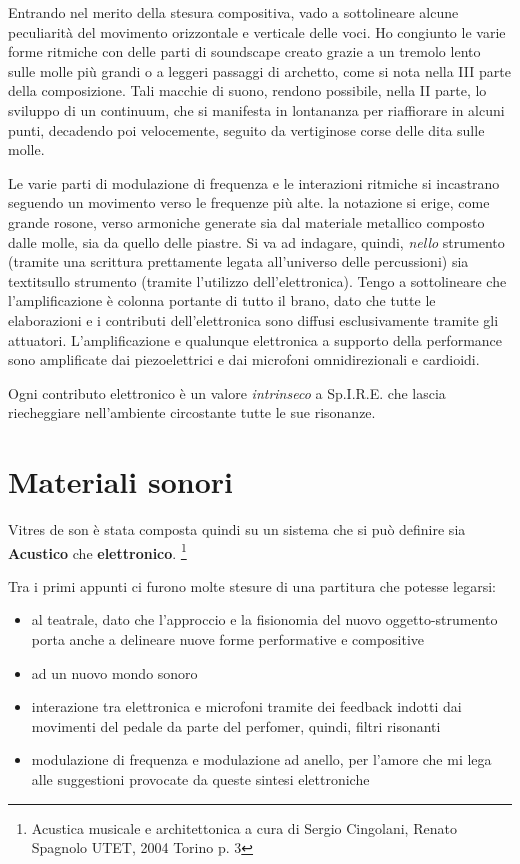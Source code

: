 Entrando nel merito della stesura compositiva, vado a sottolineare alcune peculiarità del movimento orizzontale e verticale delle voci. Ho congiunto le varie forme ritmiche con delle parti di soundscape creato grazie a un tremolo lento sulle molle più grandi o a leggeri passaggi di archetto, come si nota nella III parte della composizione. Tali macchie di suono, rendono possibile, nella II parte, lo sviluppo di un continuum, che si manifesta in lontananza per riaffiorare in alcuni punti, decadendo poi velocemente, seguito da vertiginose corse delle dita sulle molle.


Le varie parti di modulazione di frequenza e le interazioni ritmiche si incastrano seguendo un movimento verso le frequenze più alte. la notazione si erige, come grande rosone, verso armoniche generate sia dal materiale metallico composto dalle molle, sia da quello delle piastre. Si va ad indagare, quindi, \textit{nello} strumento (tramite una scrittura prettamente legata all'universo delle percussioni) sia textit{sullo} strumento (tramite l'utilizzo dell'elettronica). Tengo a sottolineare che l'amplificazione è colonna portante di tutto il brano, dato che tutte le elaborazioni e i contributi dell'elettronica sono diffusi esclusivamente tramite gli attuatori. L'amplificazione e qualunque elettronica a supporto della performance sono amplificate dai piezoelettrici e dai microfoni omnidirezionali e cardioidi.

Ogni contributo elettronico è un valore \textit{intrinseco} a Sp.I.R.E. che lascia riecheggiare nell'ambiente circostante tutte le sue risonanze.

\section{Materiali sonori}

Vitres de son è stata composta quindi su un sistema che si può definire sia \textbf{Acustico} che \textbf{elettronico}. \footnote{Acustica musicale e architettonica a cura di Sergio Cingolani, Renato Spagnolo UTET, 2004 Torino p. 3}

Tra i primi appunti ci furono molte stesure di una partitura che potesse legarsi:

\begin{itemize}
\item{al teatrale, dato che l'approccio e la fisionomia del nuovo oggetto-strumento porta anche a delineare nuove forme performative e compositive}
\item{ad un nuovo mondo sonoro}
\item{interazione tra elettronica e microfoni tramite dei feedback indotti dai movimenti del pedale da parte del perfomer, quindi, filtri risonanti}
\item{modulazione di frequenza e modulazione ad anello, per l'amore che mi lega alle suggestioni provocate da queste sintesi elettroniche}
\end{itemize}

